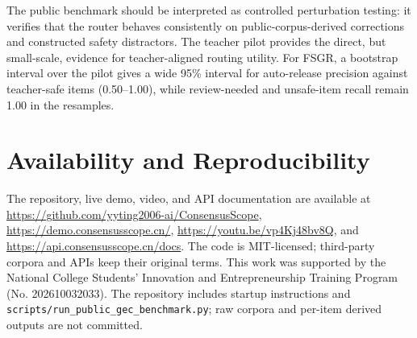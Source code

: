 \documentclass[11pt]{article}
\begin{document}
\begin{table}[t]
\centering
\scriptsize
\setlength{\tabcolsep}{2pt}
\caption{Graph stress-check coverage on 16 packaged cases. Match counts require
both expected route and expected risk level to match. Cases may activate multiple
graph signals; this table evaluates functional coverage, not statistical
significance.}
\label{tab:graphstress}
\end{table}

The public benchmark should be interpreted as controlled perturbation testing:
it verifies that the router behaves consistently on public-corpus-derived
corrections and constructed safety distractors. The teacher pilot provides the
direct, but small-scale, evidence for teacher-aligned routing utility. For FSGR,
a bootstrap interval over the pilot gives a wide 95\% interval for auto-release
precision against teacher-safe items (0.50--1.00), while review-needed and
unsafe-item recall remain 1.00 in the resamples.

\section{Availability and Reproducibility}

The repository, live demo, video, and API documentation are available at
\url{https://github.com/yyting2006-ai/ConsensusScope},
\url{https://demo.consensusscope.cn/},
\url{https://youtu.be/vp4Kj48bv8Q}, and
\url{https://api.consensusscope.cn/docs}. The code is MIT-licensed; third-party
corpora and APIs keep their original terms. This work was supported by the
National College Students' Innovation and Entrepreneurship Training Program
(No. 202610032033). The repository includes startup instructions and
\texttt{scripts/run\_public\_gec\_benchmark.py}; raw corpora and per-item
derived outputs are not committed.
\end{document}
